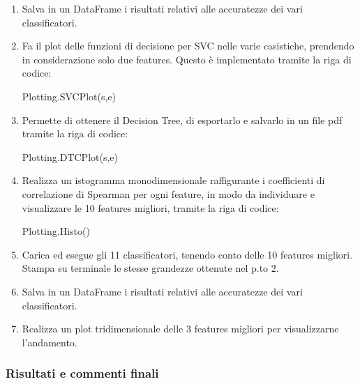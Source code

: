 \documentclass[11pt]{article}
\newenvironment{Shaded}{}{}
\newcommand{\NormalTok}[1]{{#1}}
\begin{document}
\begin{enumerate}
\def\labelenumi{\arabic{enumi}.}
\setcounter{enumi}{2}
\item
  Salva in un DataFrame i risultati relativi alle accuratezze dei vari
  classificatori.
\item
  Fa il plot delle funzioni di decisione per SVC nelle varie casistiche,
  prendendo in considerazione solo due features. Questo è implementato
  tramite la riga di codice:

\begin{Shaded}
\begin{Highlighting}[]
\NormalTok{    Plotting.SVCPlot(s,e)}
\end{Highlighting}
\end{Shaded}
\item
  Permette di ottenere il Decision Tree, di esportarlo e salvarlo in un
  file pdf tramite la riga di codice:

\begin{Shaded}
\begin{Highlighting}[]
\NormalTok{    Plotting.DTCPlot(s,e)}
\end{Highlighting}
\end{Shaded}
\item
  Realizza un istogramma monodimensionale raffigurante i coefficienti di
  correlazione di Spearman per ogni feature, in modo da individuare e
  visualizzare le 10 features migliori, tramite la riga di codice:

\begin{Shaded}
\begin{Highlighting}[]
\NormalTok{    Plotting.Histo()}
\end{Highlighting}
\end{Shaded}
\item
  Carica ed esegue gli 11 classificatori, tenendo conto delle 10
  features migliori. Stampa su terminale le stesse grandezze ottenute
  nel p.to 2.
\item
  Salva in un DataFrame i risultati relativi alle accuratezze dei vari
  classificatori.
\item
  Realizza un plot tridimensionale delle 3 features migliori per
  visualizzarne l'andamento.
\end{enumerate}

    \subsubsection{Risultati e commenti
finali}\label{risultati-e-commenti-finali}
\end{document}
